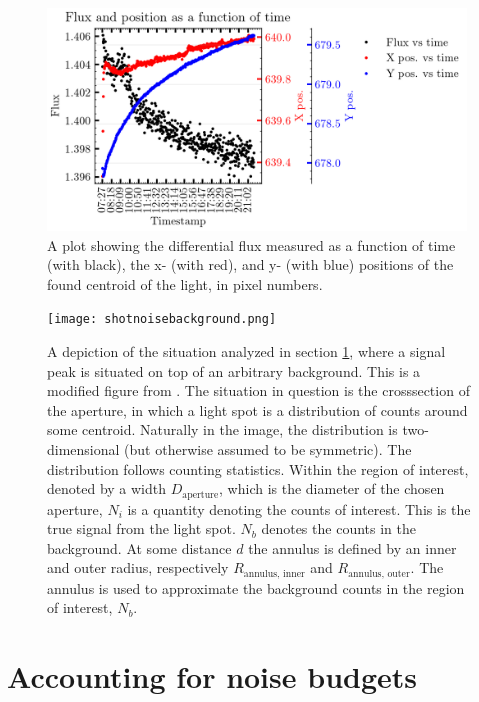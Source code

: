 \documentclass[../main.tex]{subfiles}
\begin{document}
\begin{figure}[h!]
	\centering
	\includegraphics[width = 0.99\textwidth]{fluxposvtimecorr_atikcam_1.png}
	\caption{A plot showing the differential flux measured as a function of time (with black), the x- (with red), and y- (with blue) positions of the found centroid of the light, in pixel numbers.}
	\label{fig:fluxposvtimecorr_atikcam}
\end{figure}

\pagebreak
\begin{figure}[hbt!]
	\centering
	\texttt{[image: shotnoisebackground.png]}
	\caption{A depiction of the situation analyzed in section \ref{sect:shotnoise_missionreq}, where a signal peak is situated on top of an arbitrary background. This is a modified figure from \cite{noisefigbookdetector}. The situation in question is the crosssection of the aperture, in which a light spot is a distribution of counts around some centroid. Naturally in the image, the distribution is two-dimensional (but otherwise assumed to be symmetric). The distribution follows counting statistics. Within the region of interest, denoted by a width $D_\text{aperture}$, which is the diameter of the chosen aperture, $N_i$ is a quantity denoting the counts of interest. This is the true signal from the light spot. $N_b$ denotes the counts in the background. At some distance $d$ the annulus is defined by an inner and outer radius, respectively $R_\text{annulus, inner}$ and $R_\text{annulus, outer}$. The annulus is used to approximate the background counts in the region of interest, $N_b$.}
	\label{fig:shotnoisebackground}
\end{figure}
\pagebreak
\section{Accounting for noise budgets}\label{sect:shotnoise_missionreq}
\end{document}
